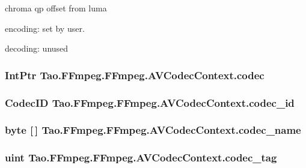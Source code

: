 \label{struct_tao_1_1_f_fmpeg_1_1_f_fmpeg_1_1_a_v_codec_context_aa3c4c208f721b42569672e5bc3a3e35e}
chroma qp offset from luma
\begin{DoxyItemize}
\item encoding: set by user.
\item decoding: unused 
\end{DoxyItemize}\hypertarget{struct_tao_1_1_f_fmpeg_1_1_f_fmpeg_1_1_a_v_codec_context_a1bf06b4ba34c3bf922f80594d90b0afc}{
\subsubsection[{codec}]{\setlength{\rightskip}{0pt plus 5cm}IntPtr {\bf Tao.FFmpeg.FFmpeg.AVCodecContext.codec}}}
\label{struct_tao_1_1_f_fmpeg_1_1_f_fmpeg_1_1_a_v_codec_context_a1bf06b4ba34c3bf922f80594d90b0afc}
\hypertarget{struct_tao_1_1_f_fmpeg_1_1_f_fmpeg_1_1_a_v_codec_context_a02e1012b124f193fa8c1b5028404f7f8}{
\subsubsection[{codec\_\-id}]{\setlength{\rightskip}{0pt plus 5cm}CodecID {\bf Tao.FFmpeg.FFmpeg.AVCodecContext.codec\_\-id}}}
\label{struct_tao_1_1_f_fmpeg_1_1_f_fmpeg_1_1_a_v_codec_context_a02e1012b124f193fa8c1b5028404f7f8}
\hypertarget{struct_tao_1_1_f_fmpeg_1_1_f_fmpeg_1_1_a_v_codec_context_a6f1000b55bc376513e5c9b54de40d4cb}{
\subsubsection[{codec\_\-name}]{\setlength{\rightskip}{0pt plus 5cm}byte \mbox{[}$\,$\mbox{]} {\bf Tao.FFmpeg.FFmpeg.AVCodecContext.codec\_\-name}}}
\label{struct_tao_1_1_f_fmpeg_1_1_f_fmpeg_1_1_a_v_codec_context_a6f1000b55bc376513e5c9b54de40d4cb}
\hypertarget{struct_tao_1_1_f_fmpeg_1_1_f_fmpeg_1_1_a_v_codec_context_aba8d4eed4223e45465f75037f66ce477}{
\subsubsection[{codec\_\-tag}]{\setlength{\rightskip}{0pt plus 5cm}uint {\bf Tao.FFmpeg.FFmpeg.AVCodecContext.codec\_\-tag}}}
